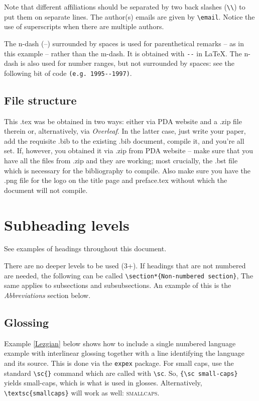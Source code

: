 Note that different affiliations should be separated by two back slashes (\verb=\\=) to put them on separate lines. The author(s) emails are given by \verb=\email=. Notice the use of superscripts when there are multiple authors.

The n-dash (--) surrounded by spaces is used for parenthetical remarks -- as in this example -- rather than the m-dash. It is obtained with \verb=--= in LaTeX. The n-dash is also used for number ranges, but not surrounded by spaces: see the following bit of code \verb=(e.g. 1995--1997)=.

\subsection{File structure}
This .tex was be obtained in two ways: either via PDA website and a .zip file therein or, alternatively, via \textit{Overleaf}. In the latter case, just write your paper, add the requisite .bib to the existing .bib document, compile it, and you're all set. If, however, you obtained it via .zip from PDA website -- make sure that you have all the files from .zip and they are working; most crucially, the .bst file which is necessary for the bibliography to compile. Also make sure you have the .png file for the logo on the title page and preface.tex without which the document will not compile. 

\section{Subheading levels}
See examples of headings throughout this document.

There are no deeper levels to be used (3+). If headings that are not numbered are needed, the following can be called 
\pex 
\verb=\section*{Non-numbered section}=,
\xe 
The same applies to subsections and subsubsections. An example of this is the \textit{Abbreviations} section below.

\subsection{Glossing}\label{gloss}
Example \ref{Lezgian} below shows how to include a single numbered language example with interlinear glossing together with a line identifying the language and its source. This is done via the \verb=expex= package. For small caps, use the standard \verb=\sc{}= command which are called with \verb=\sc=. So, \verb={\sc small-caps}= yields {\sc small-caps}, which is what is used in glosses. Alternatively, \verb=\textsc{smallcaps}= will work as well: \textsc{smallcaps}.

